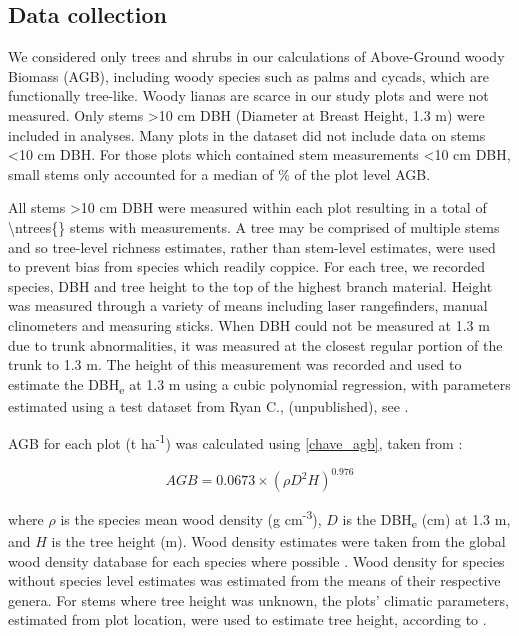 \documentclass[11pt,a4paper]{article}
\begin{document}
\subsection{Data collection}
 
We considered only trees and shrubs in our calculations of Above-Ground woody Biomass (AGB), including woody species such as palms and cycads, which are functionally tree-like. Woody lianas are scarce in our study plots and were not measured. Only stems >10 cm DBH (Diameter at Breast Height, 1.3 m) were included in analyses. Many plots in the dataset did not include data on stems <10 cm DBH. For those plots which contained stem measurements <10 cm DBH, small stems only accounted for a median of \percsmallagb{}\% of the plot level AGB. 

All stems >10 cm DBH were measured within each plot resulting in a total of \num[group-separator={,}]{\ntrees{}} stems with measurements. A tree may be comprised of multiple stems and so tree-level richness estimates, rather than stem-level estimates, were used to prevent bias from species which readily coppice. For each tree, we recorded species, DBH and tree height to the top of the highest branch material. Height was measured through a variety of means including laser rangefinders, manual clinometers and measuring sticks. When DBH could not be measured at 1.3 m due to trunk abnormalities, it was measured at the closest regular portion of the trunk to 1.3 m. The height of this measurement was recorded and used to estimate the DBH\textsubscript{e} at 1.3 m using a cubic polynomial regression, with parameters estimated using a test dataset from Ryan C., (unpublished), see \citet{Godlee2020}.

AGB for each plot (t ha\textsuperscript{-1}) was calculated using \autoref{chave_agb}, taken from \citet{Chave2014}:

\begin{equation}
	AGB = 0.0673 \times (\rho D^{2} H)^{0.976}
	\label{chave_agb}
\end{equation}

where $\rho$ is the species mean wood density (g cm\textsuperscript{-3}), $D$ is the DBH\textsubscript{e} (cm) at 1.3 m, and $H$ is the tree height (m). Wood density estimates were taken from the global wood density database for each species where possible \citep{Chave2009, Zanne2009}. Wood density for species without species level estimates was estimated from the means of their respective genera. For stems where tree height was unknown, the plots' climatic parameters, estimated from plot location, were used to estimate tree height, according to \citet{Chave2014}.
\end{document}
